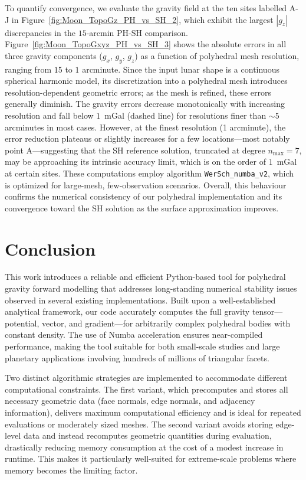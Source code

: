 \documentclass{seg}
\begin{document}
To quantify convergence, we evaluate the gravity field at the ten sites labelled A-J in Figure~\ref{fig:Moon_TopoGz_PH_vs_SH_2}, which exhibit the largest $|g_z|$ discrepancies in the $15$-arcmin PH-SH comparison. Figure~\ref{fig:Moon_TopoGxyz_PH_vs_SH_3} shows the absolute errors in all three gravity components ($g_x$, $g_y$, $g_z$) as a function of polyhedral mesh resolution, ranging from $15$ to $1$ arcminute. Since the input lunar shape is a continuous spherical harmonic model, its discretization into a polyhedral mesh introduces resolution-dependent geometric errors; as the mesh is refined, these errors generally diminish. The gravity errors decrease monotonically with increasing resolution and fall below $1$~mGal (dashed line) for resolutions finer than $\sim\!5$ arcminutes in most cases. However, at the finest resolution (1 arcminute), the error reduction plateaus or slightly increases for a few locations—most notably point A—suggesting that the SH reference solution, truncated at degree $n_{\text{max}} = 7$, may be approaching its intrinsic accuracy limit, which is on the order of $1$~mGal at certain sites. These computations employ algorithm \texttt{WerSch\_numba\_v2}, which is optimized for large-mesh, few-observation scenarios. Overall, this behaviour confirms the numerical consistency of our polyhedral implementation and its convergence toward the SH solution as the surface approximation improves.

\section*{Conclusion}
This work introduces a reliable and efficient Python-based tool for polyhedral gravity forward modelling that addresses long-standing numerical stability issues observed in several existing implementations. Built upon a well-established analytical framework, our code accurately computes the full gravity tensor—potential, vector, and gradient—for arbitrarily complex polyhedral bodies with constant density. The use of Numba acceleration ensures near-compiled performance, making the tool suitable for both small-scale studies and large planetary applications involving hundreds of millions of triangular facets.

Two distinct algorithmic strategies are implemented to accommodate different computational constraints. The first variant, which precomputes and stores all necessary geometric data (face normals, edge normals, and adjacency information), delivers maximum computational efficiency and is ideal for repeated evaluations or moderately sized meshes. The second variant avoids storing edge-level data and instead recomputes geometric quantities during evaluation, drastically reducing memory consumption at the cost of a modest increase in runtime. This makes it particularly well-suited for extreme-scale problems where memory becomes the limiting factor.
\end{document}
